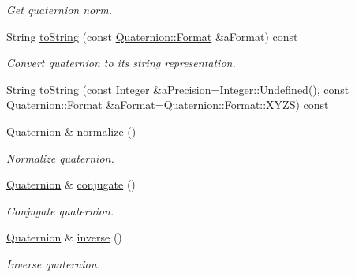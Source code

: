 \begin{DoxyCompactItemize}
\begin{DoxyCompactList}\small\item\em Get quaternion norm. \end{DoxyCompactList}\item 
String \hyperlink{classlibrary_1_1math_1_1geom_1_1d3_1_1trf_1_1rot_1_1_quaternion_a92e9e07e4edb3cc77c308ec7f5888515}{to\+String} (const \hyperlink{classlibrary_1_1math_1_1geom_1_1d3_1_1trf_1_1rot_1_1_quaternion_aa86c54f6157891b2f1a517c672d6deec}{Quaternion\+::\+Format} \&a\+Format) const
\begin{DoxyCompactList}\small\item\em Convert quaternion to its string representation. \end{DoxyCompactList}\item 
String \hyperlink{classlibrary_1_1math_1_1geom_1_1d3_1_1trf_1_1rot_1_1_quaternion_aea4f081b98f86216e9ef8c64d87ed89e}{to\+String} (const Integer \&a\+Precision=Integer\+::\+Undefined(), const \hyperlink{classlibrary_1_1math_1_1geom_1_1d3_1_1trf_1_1rot_1_1_quaternion_aa86c54f6157891b2f1a517c672d6deec}{Quaternion\+::\+Format} \&a\+Format=\hyperlink{classlibrary_1_1math_1_1geom_1_1d3_1_1trf_1_1rot_1_1_quaternion_aa86c54f6157891b2f1a517c672d6deeca11c51ecd5dc6f86ba3c1ae79e21482f5}{Quaternion\+::\+Format\+::\+X\+Y\+ZS}) const
\item 
\hyperlink{classlibrary_1_1math_1_1geom_1_1d3_1_1trf_1_1rot_1_1_quaternion}{Quaternion} \& \hyperlink{classlibrary_1_1math_1_1geom_1_1d3_1_1trf_1_1rot_1_1_quaternion_a0432c2d7b73545a6a77207c116c0eec2}{normalize} ()
\begin{DoxyCompactList}\small\item\em Normalize quaternion. \end{DoxyCompactList}\item 
\hyperlink{classlibrary_1_1math_1_1geom_1_1d3_1_1trf_1_1rot_1_1_quaternion}{Quaternion} \& \hyperlink{classlibrary_1_1math_1_1geom_1_1d3_1_1trf_1_1rot_1_1_quaternion_a2c27f0a46d1f156b8d05e0e9746b33f9}{conjugate} ()
\begin{DoxyCompactList}\small\item\em Conjugate quaternion. \end{DoxyCompactList}\item 
\hyperlink{classlibrary_1_1math_1_1geom_1_1d3_1_1trf_1_1rot_1_1_quaternion}{Quaternion} \& \hyperlink{classlibrary_1_1math_1_1geom_1_1d3_1_1trf_1_1rot_1_1_quaternion_a9d35d28051651be52dde4f495f23cf7a}{inverse} ()
\begin{DoxyCompactList}\small\item\em Inverse quaternion. \end{DoxyCompactList}\item 

\end{DoxyCompactItemize}
